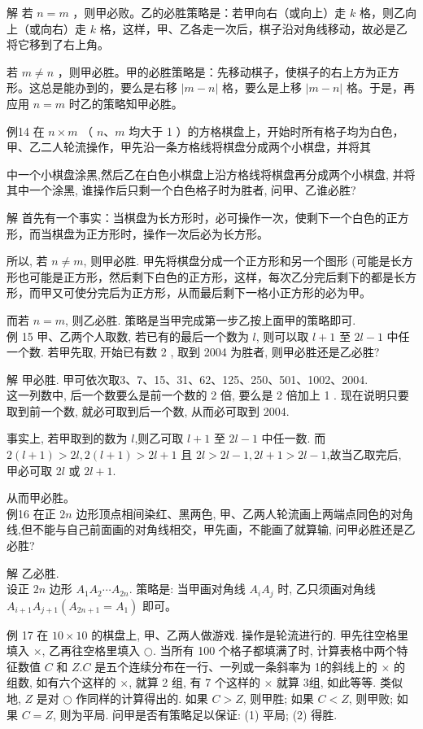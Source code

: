 \documentclass[10pt]{article}
\begin{document}
解 若 $n=m$ ，则甲必败。乙的必胜策略是：若甲向右（或向上）走 $k$ 格，则乙向上（或向右）走 $k$ 格，这样，甲、乙各走一次后，棋子沿对角线移动，故必是乙将它移到了右上角。

若 $m \neq n$ ，则甲必胜。甲的必胜策略是：先移动棋子，使棋子的右上方为正方形。这总是能办到的，要么是右移 $|m-n|$ 格，要么是上移 $|m-n|$ 格。于是，再应用 $n=m$ 时乙的策略知甲必胜。

例14 在 $n \times m$ （ $n 、 m$ 均大于 1 ）的方格棋盘上，开始时所有格子均为白色，甲、乙二人轮流操作，甲先沿一条方格线将棋盘分成两个小棋盘，并将其

中一个小棋盘涂黑,然后乙在白色小棋盘上沿方格线将棋盘再分成两个小棋盘, 并将其中一个涂黑, 谁操作后只剩一个白色格子时为胜者, 问甲、乙谁必胜?

解 首先有一个事实：当棋盘为长方形时，必可操作一次，使剩下一个白色的正方形，而当棋盘为正方形时，操作一次后必为长方形。

所以, 若 $n \neq m$, 则甲必胜. 甲先将棋盘分成一个正方形和另一个图形 (可能是长方形也可能是正方形，然后剩下白色的正方形，这样，每次乙分完后剩下的都是长方形，而甲又可使分完后为正方形，从而最后剩下一格小正方形的必为甲。

而若 $n=m$, 则乙必胜. 策略是当甲完成第一步乙按上面甲的策略即可.\\
例 15 甲、乙两个人取数, 若已有的最后一个数为 $l$, 则可以取 $l+1$ 至 $2 l-1$ 中任一个数. 若甲先取, 开始已有数 2 , 取到 2004 为胜者, 则甲必胜还是乙必胜?

解 甲必胜. 甲可依次取3、7、15、31、62、125、250、501、1002、2004.\\
这一列数中, 后一个数要么是前一个数的 2 倍, 要么是 2 倍加上 1 . 现在说明只要取到前一个数, 就必可取到后一个数, 从而必可取到 2004.

事实上, 若甲取到的数为 $l$,则乙可取 $l+1$ 至 $2 l-1$ 中任一数. 而 $2(l+1)>2 l, 2(l+1)>2 l+1$ 且 $2 l>2 l-1,2 l+1>2 l-1$,故当乙取完后, 甲必可取 $2 l$ 或 $2 l+1$.

从而甲必胜。\\
例16 在正 $2 n$ 边形顶点相间染红、黑两色, 甲、乙两人轮流画上两端点同色的对角线,但不能与自己前面画的对角线相交，甲先画，不能画了就算输, 问甲必胜还是乙必胜?

解 乙必胜.\\
设正 $2 n$ 边形 $A_{1} A_{2} \cdots A_{2 n}$. 策略是: 当甲画对角线 $A_{i} A_{j}$ 时, 乙只须画对角线 $A_{i+1} A_{j+1}\left(A_{2 n+1}=A_{1}\right)$ 即可。

例 17 在 $10 \times 10$ 的棋盘上, 甲、乙两人做游戏. 操作是轮流进行的. 甲先往空格里填入 $\times$, 乙再往空格里填入 $\bigcirc$. 当所有 100 个格子都填满了时, 计算表格中两个特征数值 $C$ 和 $Z . C$ 是五个连续分布在一行、一列或一条斜率为 1的斜线上的 $\times$ 的组数, 如有六个这样的 $\times$, 就算 2 组, 有 7 个这样的 $\times$ 就算 3组, 如此等等. 类似地, $Z$ 是对 $\bigcirc$ 作同样的计算得出的. 如果 $C>Z$, 则甲胜; 如果 $C<Z$, 则甲败; 如果 $C=Z$, 则为平局. 问甲是否有策略足以保证: (1) 平局; (2) 得胜.
\end{document}
